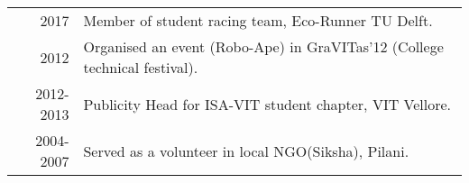 %
%





\begin{tabular}{rl}	
	2017 & Member of student racing team, Eco-Runner TU Delft.\\
	2012 & Organised an event (Robo-Ape) in GraVITas'12 (College technical festival). \\
	2012-2013 & Publicity Head for ISA-VIT student chapter, VIT Vellore. \\
	2004-2007 & Served as a volunteer in local NGO(Siksha), Pilani.\\
\end{tabular}